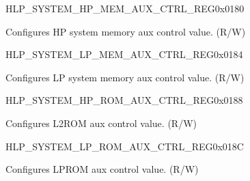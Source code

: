 \begin{register}{H}{LP\_SYSTEM\_HP\_MEM\_AUX\_CTRL\_REG}{0x0180}\label{regdesc:LPSYSTEMHPMEMAUXCTRLREG}
%
\regnewline%
\begin{regdesc}\begin{reglist}
\label{fielddesc:LPSYSTEMHPMEMAUXCTRL}\item [LP\_SYSTEM\_HP\_MEM\_AUX\_CTRL] Configures HP system memory aux control value. (R/W)
\end{reglist}\end{regdesc}
\end{register}


\begin{register}{H}{LP\_SYSTEM\_LP\_MEM\_AUX\_CTRL\_REG}{0x0184}\label{regdesc:LPSYSTEMLPMEMAUXCTRLREG}
%
\regnewline%
\begin{regdesc}\begin{reglist}
\label{fielddesc:LPSYSTEMLPMEMAUXCTRL}\item [LP\_SYSTEM\_LP\_MEM\_AUX\_CTRL] Configures LP system memory aux control value. (R/W)
\end{reglist}\end{regdesc}
\end{register}


\begin{register}{H}{LP\_SYSTEM\_HP\_ROM\_AUX\_CTRL\_REG}{0x0188}\label{regdesc:LPSYSTEMHPROMAUXCTRLREG}
%
\regnewline%
\begin{regdesc}\begin{reglist}
\label{fielddesc:LPSYSTEMHPROMAUXCTRL}\item [LP\_SYSTEM\_HP\_ROM\_AUX\_CTRL] Configures L2ROM aux control value. (R/W)
\end{reglist}\end{regdesc}
\end{register}


\begin{register}{H}{LP\_SYSTEM\_LP\_ROM\_AUX\_CTRL\_REG}{0x018C}\label{regdesc:LPSYSTEMLPROMAUXCTRLREG}
%
\regnewline%
\begin{regdesc}\begin{reglist}
\label{fielddesc:LPSYSTEMLPROMAUXCTRL}\item [LP\_SYSTEM\_LP\_ROM\_AUX\_CTRL] Configures LPROM aux control value. (R/W)
\end{reglist}\end{regdesc}
\end{register}


